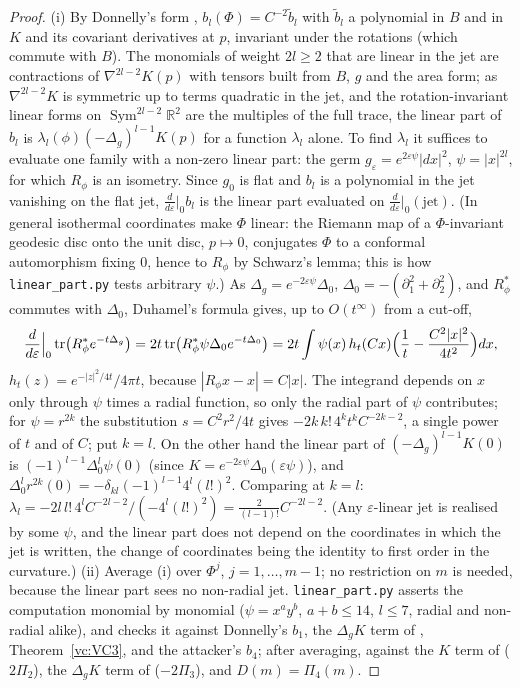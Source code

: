 \begin{proof}
(i) By Donnelly's form \cite[4.2]{dggw2008}, $b_l(\Phi)=C^{-2}\tilde b_l$ with $\tilde b_l$ a polynomial in $B$ and
in $K$ and its covariant derivatives at $p$, invariant under the rotations (which commute with $B$). The
monomials of weight $2l\ge2$ that are linear in the jet are contractions of $\nabla^{2l-2}K(p)$ with tensors
built from $B$, $g$ and the area form; as $\nabla^{2l-2}K$ is symmetric up to terms quadratic in the jet, and
the rotation-invariant linear forms on $\operatorname{Sym}^{2l-2}\mathbb R^2$ are the multiples of the full
trace, the linear part of $b_l$ is $\lambda_l(\phi)(-\Delta_g)^{l-1}K(p)$ for a function $\lambda_l$ alone. To
find $\lambda_l$ it suffices to evaluate one family with a non-zero linear part: the
germ $g_\varepsilon=e^{2\varepsilon\psi}|dx|^2$, $\psi=|x|^{2l}$, for which $R_\phi$ is an isometry. Since $g_0$ is
flat and $b_l$ is a polynomial in the jet vanishing on the flat jet, $\frac{d}{d\varepsilon}|_0b_l$ is the linear part
evaluated on $\frac{d}{d\varepsilon}|_0(\text{jet})$. (In general isothermal coordinates make $\Phi$ linear: the Riemann
map of a $\Phi$-invariant geodesic disc onto the unit disc, $p\mapsto0$, conjugates $\Phi$ to a conformal
automorphism fixing $0$, hence to $R_\phi$ by Schwarz's lemma; this is how \texttt{linear\_part.py} tests arbitrary
$\psi$.) As
$\Delta_g=e^{-2\varepsilon\psi}\Delta_0$, $\Delta_0=-(\partial_1^2+\partial_2^2)$, and $R_\phi^*$ commutes with $\Delta_0$, Duhamel's formula
gives, up to $O(t^\infty)$ from a cut-off,
\[
\frac{d}{d\varepsilon}\Big|_0\operatorname{tr}\bigl(R_\phi^*e^{-t\Delta_g}\bigr)
=2t\operatorname{tr}\bigl(R_\phi^*\psi\Delta_0e^{-t\Delta_0}\bigr)
=2t\int\psi(x)\,h_t(Cx)\Bigl(\frac1t-\frac{C^2|x|^2}{4t^2}\Bigr)dx,
\]
$h_t(z)=e^{-|z|^2/4t}/4\pi t$, because $|R_\phi x-x|=C|x|$. The integrand depends on $x$ only through
$\psi$ times a radial function, so only the radial part of $\psi$ contributes; for $\psi=r^{2k}$ the
substitution $s=C^2r^2/4t$ gives $-2k\,k!\,4^kt^kC^{-2k-2}$, a single power of $t$ and of $C$; put $k=l$. On the other hand the linear part of
$(-\Delta_g)^{l-1}K(0)$ is $(-1)^{l-1}\Delta_0^l\psi(0)$ (since $K=e^{-2\varepsilon\psi}\Delta_0(\varepsilon\psi)$), and
$\Delta_0^lr^{2k}(0)=-\delta_{kl}(-1)^{l-1}4^l(l!)^2$. Comparing at $k=l$: $\lambda_l=-2l\,l!\,4^lC^{-2l-2}/(-4^l(l!)^2)
=\frac2{(l-1)!}C^{-2l-2}$. (Any $\varepsilon$-linear jet is realised by some $\psi$, and the linear part does
not depend on the coordinates in which the jet is written, the change of coordinates being the identity
to first order in the curvature.)
(ii) Average (i) over $\Phi^j$, $j=1,\dots,m-1$; no restriction on $m$ is needed, because the linear part
sees no non-radial jet.
\texttt{linear\_part.py} asserts the computation monomial by monomial ($\psi=x^ay^b$, $a+b\le14$,
$l\le7$, radial and non-radial alike), and checks it against Donnelly's $b_1$, the $\Delta_gK$ term of
\cite[Thm~3.7]{schueth2019}, Theorem~\ref{vc:VC3}, and the attacker's $b_4$; after averaging, against the
$K$ term of \cite[Rem.~4.2]{schueth2019} ($2\Pi_2$), the $\Delta_gK$ term of \cite[Thm~4.1]{schueth2019}
($-2\Pi_3$), and $D(m)=\Pi_4(m)$.
\end{proof}


